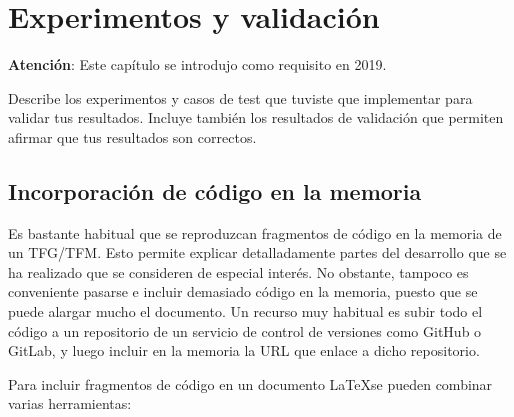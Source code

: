 \documentclass[a4paper, 12pt]{book}
\begin{document}
\cleardoublepage


\chapter{Experimentos y validación}
\label{chap:experimentos}

\textbf{Atención}: Este capítulo se introdujo como requisito en 2019.

Describe los experimentos y casos de test que tuviste que implementar para validar tus resultados. 
Incluye también los resultados de validación que permiten afirmar que tus resultados son correctos.

\section{Incorporación de código en la memoria}

Es bastante habitual que se reproduzcan fragmentos de código en la memoria de un TFG/TFM.
Esto permite explicar detalladamente partes del desarrollo que se ha realizado que se consideren
de especial interés. No obstante, tampoco es conveniente pasarse e incluir demasiado código en
la memoria, puesto que se puede alargar mucho el documento. Un recurso muy habitual es subir
todo el código a un repositorio de un servicio de control de versiones como GitHub o GitLab,
y luego incluir en la memoria la URL que enlace a dicho repositorio.

Para incluir fragmentos de código en un documento \LaTeX se pueden combinar varias
herramientas:

\end{document}
